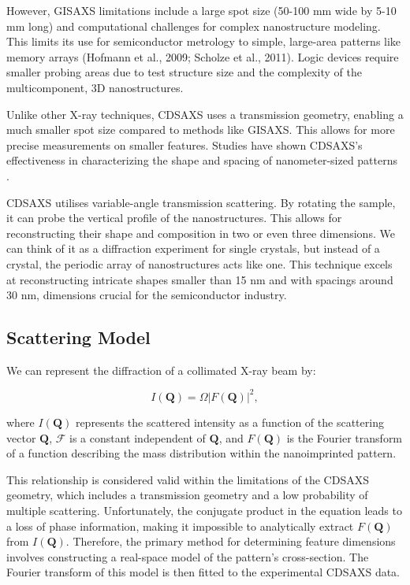 \medskip

However, GISAXS limitations include a large spot size (50-100 mm wide by 5-10 mm long) and
computational challenges for complex nanostructure modeling. This limits its use for 
semiconductor metrology to simple, large-area patterns like memory arrays (Hofmann et al.,
2009; Scholze et al., 2011). Logic devices require smaller probing areas due to test structure 
size and the complexity of the multicomponent, 3D nanostructures. \cite{phd_freychet}

\medskip

Unlike other X-ray techniques, CDSAXS uses a transmission geometry, enabling a much smaller
spot size compared to methods like GISAXS. This allows for more precise measurements on smaller
features. Studies have shown CDSAXS's effectiveness in characterizing the shape and spacing of
nanometer-sized patterns \cite{sunday_2015}.

\medskip
CDSAXS  utilises variable-angle transmission scattering. By rotating the sample, it can probe the vertical profile of the nanostructures. This allows 
for reconstructing their shape and composition in two or even three dimensions.
We can think of it as a diffraction experiment for single crystals, but instead of a crystal, the 
periodic array of nanostructures acts like one. This technique excels at reconstructing 
intricate shapes smaller than 15 nm and with spacings around 30 nm, dimensions crucial for 
the semiconductor industry. \cite{first_cdsaxs_article}

\subsection{Scattering Model} \label{sec:scattering_model}

\medskip
We can represent the diffraction of a collimated X-ray beam by:

\begin{equation}
    I(\mathbf{Q}) = \varOmega | F(\mathbf{Q}) |^2,
\end{equation}
    
where $I(\mathbf{Q})$ represents the scattered intensity as a function of the scattering
vector $\mathbf{Q}$, $\mathcal{F}$ is a constant independent of $\mathbf{Q}$,
and $F(\mathbf{Q})$ is the Fourier transform of a function describing the mass
distribution within the nanoimprinted pattern. 
    
This relationship is considered valid within the limitations of the CDSAXS geometry,
which includes a transmission geometry and a low probability of multiple scattering.    
Unfortunately, the conjugate product in the equation leads to a loss of phase
information, making it impossible to analytically extract $F(\mathbf{Q})$ from $I(\mathbf{Q})$.
Therefore, the primary method for determining feature dimensions involves constructing
a real-space model of the pattern's cross-section. The Fourier transform of this 
model is then fitted to the experimental CDSAXS data.

